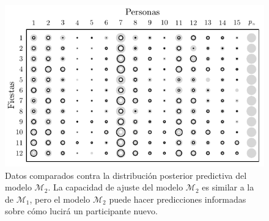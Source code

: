 \documentclass{article}
\begin{document}
\begin{figure}[H]
\centering
\setlength\fboxsep{0pt}
\setlength\fboxrule{0.5pt}
\includegraphics[trim=0cm 0cm 0cm 0cm, clip=true, width=1\textwidth]	{data_pos_pred_m2.pdf}
\caption{Datos comparados contra la distribución posterior predictiva del modelo $\mathcal M_2$. La capacidad de ajuste del modelo $\mathcal M_2$ es similar a la de $\mathcal M_1$, pero el modelo $\mathcal M_2$ puede hacer predicciones informadas sobre cómo lucirá un participante nuevo.}
\label{fig:data_2}
\end{figure}
\end{document}
